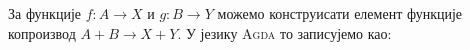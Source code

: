 За функције $f : A \to X$ и $g : B \to Y$ можемо конструисати елемент функције копроизвод $A + B \to X + Y$. У језику \textsc{Agda} то записујемо као:
\begin{code}%
\>[0]%
\>[497I]\AgdaSymbol{:}\AgdaSpace{}%
\AgdaSymbol{\{}\AgdaSpace{}%
\AgdaSpace{}%
\AgdaSymbol{:}\AgdaSpace{}%
\AgdaSpace{}%
\AgdaSpace{}%
\AgdaSymbol{\}}\AgdaSpace{}%
\AgdaSymbol{\{}\AgdaSpace{}%
\AgdaSpace{}%
\AgdaSymbol{:}\AgdaSpace{}%
\AgdaSpace{}%
\AgdaSpace{}%
\AgdaSymbol{\}}\AgdaSpace{}%
\AgdaSymbol{(}\AgdaSpace{}%
\AgdaSymbol{:}\AgdaSpace{}%
\AgdaSpace{}%
\AgdaSpace{}%
\AgdaSymbol{)}\AgdaSpace{}%
\AgdaSymbol{(}\AgdaSpace{}%
\AgdaSymbol{:}\AgdaSpace{}%
\AgdaSpace{}%
\AgdaSpace{}%
\AgdaSymbol{)}\<%
\\
\>[.][@{}l@{}]\<[497I]%
\>[5]\AgdaSpace{}%
\AgdaSymbol{(}\AgdaSpace{}%
\AgdaOperator{\AgdaDatatype{+}}\AgdaSpace{}%
\AgdaSymbol{)}\AgdaSpace{}%
\AgdaSpace{}%
\AgdaSymbol{(}\AgdaSpace{}%
\AgdaOperator{\AgdaDatatype{+}}\AgdaSpace{}%
\AgdaSymbol{)}\<%
\\
\>[0]\AgdaSymbol{(}\AgdaSpace{}%
\AgdaSpace{}%
\AgdaSymbol{)}\AgdaSpace{}%
\AgdaSymbol{(}\AgdaSpace{}%
\AgdaSymbol{)}\AgdaSpace{}%
\AgdaSymbol{=}\AgdaSpace{}%
\AgdaSpace{}%
\AgdaSymbol{(}\AgdaSpace{}%
\AgdaSymbol{)}\<%
\\
\>[0]\AgdaSymbol{(}\AgdaSpace{}%
\AgdaSpace{}%
\AgdaSymbol{)}\AgdaSpace{}%
\AgdaSymbol{(}\AgdaSpace{}%
\AgdaSymbol{)}\AgdaSpace{}%
\AgdaSymbol{=}\AgdaSpace{}%
\AgdaSpace{}%
\AgdaSymbol{(}\AgdaSpace{}%
\AgdaSymbol{)}\<%
\end{code}

